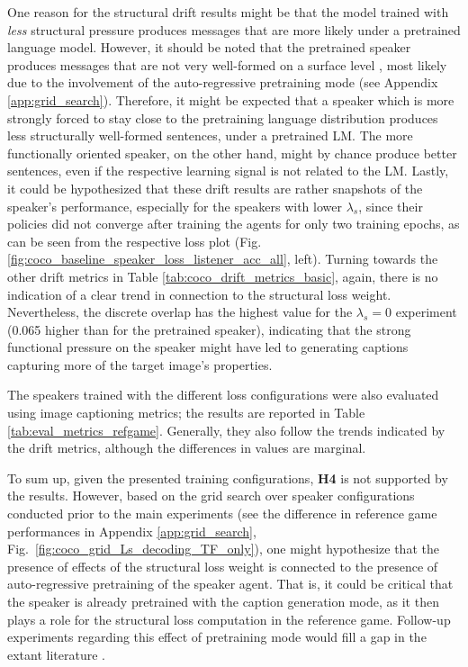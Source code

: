 One reason for the structural drift results might be that the model trained with \emph{less} structural pressure produces messages that are more likely under a pretrained language model. However, it should be noted that the pretrained speaker produces messages that are not very well-formed on a surface level , most likely due to the involvement of the auto-regressive pretraining mode (see Appendix \ref{app:grid_search}). Therefore, it might be expected that a speaker which is more strongly forced to stay close to the pretraining language distribution produces less structurally well-formed sentences, under a pretrained LM. The more functionally oriented speaker, on the other hand, might by chance produce better sentences, even if the respective learning signal is not related to the LM. Lastly, it could be hypothesized that these drift results are rather snapshots of the speaker's performance, especially for the speakers with lower $\lambda_s$, since their policies did not converge after training the agents for only two training epochs, as can be seen from the respective loss plot (Fig. \ref{fig:coco_baseline_speaker_loss_listener_acc_all}, left). 
Turning towards the other drift metrics in Table \ref{tab:coco_drift_metrics_basic}, again, there is no indication of a clear trend in connection to the structural loss weight. Nevertheless, the discrete overlap has the highest value for the $\lambda_s = 0$ experiment (0.065 higher than for the pretrained speaker), indicating that the strong functional pressure on the speaker might have led to generating captions capturing more of the target image's properties.

The speakers trained with the different loss configurations were also evaluated using image captioning metrics; the results are reported in Table \ref{tab:eval_metrics_refgame}. Generally, they also follow the trends indicated by the drift metrics, although the differences in values are marginal.

To sum up, given the presented training configurations, \textbf{H4} is not supported by the results. However, based on the grid search over speaker configurations conducted prior to the main experiments (see the difference in reference game performances in Appendix \ref{app:grid_search}, Fig.~\ref{fig:coco_grid_Ls_decoding_TF_only}), one might hypothesize that the presence of effects of the structural loss weight is connected to the presence of auto-regressive pretraining of the speaker agent. That is, it could be critical that the speaker is already pretrained with the caption generation mode, as it then plays a role for the structural loss computation in the reference game. Follow-up experiments regarding this effect of pretraining mode would fill a gap in the extant literature \parencite[but see][for related work]{lowe2020interaction}.

